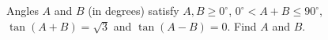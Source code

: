 Angles $A$ and $B$ (in degrees) satisfy $A,B\ge0^\circ$, $0^\circ<A+B\le90^\circ$, $\tan(A+B)=\sqrt3$ and $\tan(A-B)=0$. Find $A$ and $B$.
